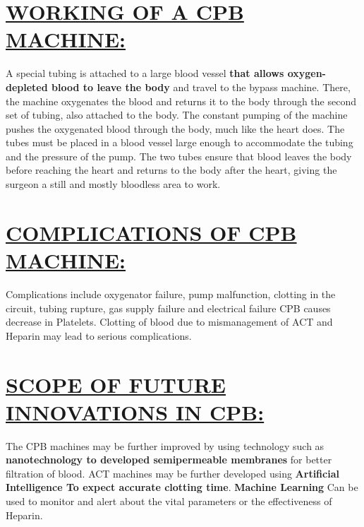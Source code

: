 \documentclass[12pt]{article}
\begin{document}
\section{\underline{WORKING OF A CPB MACHINE:}}
A special tubing is attached  to a large blood vessel \textbf{that allows oxygen-depleted blood to leave the body} and travel to the bypass machine. There, the machine oxygenates the blood and returns it to the body through the second set of tubing, also attached to the body. The constant pumping of the machine pushes the oxygenated blood through the body, much like the heart does.
The tubes must be placed in a blood vessel large enough to accommodate the tubing and the pressure of the pump. The two tubes ensure that blood leaves the body before reaching the heart and returns to the body after the heart, giving the surgeon a still and mostly bloodless area to work.

\section{\underline{COMPLICATIONS OF CPB MACHINE:}}
Complications include oxygenator failure, pump malfunction, clotting in the circuit, tubing rupture, gas supply failure and electrical failure
CPB causes decrease in Platelets.
Clotting of blood due to mismanagement of ACT and Heparin may lead to serious complications.
\section{\underline{SCOPE OF FUTURE INNOVATIONS IN CPB:}}
The CPB machines may be further improved by using technology such as \textbf{nanotechnology to developed semipermeable membranes} for better filtration of blood. ACT machines may be further developed using \textbf{Artificial Intelligence To expect accurate clotting time}. \textbf{Machine Learning} Can be used to monitor and alert about the vital parameters or the effectiveness of Heparin.
\end{document}
